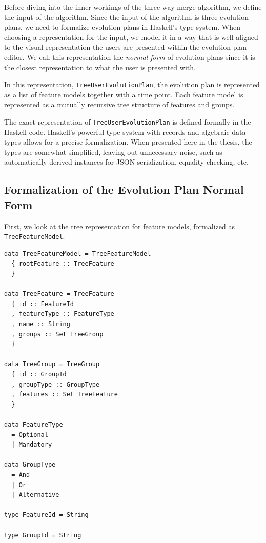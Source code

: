 \documentclass[a4paper,english]{ifimaster}
\begin{document}
Before diving into the inner workings of the three-way merge algorithm, we define the input of the algorithm. Since the input of the algorithm is three evolution plans, we need to formalize evolution plans in Haskell's type system. When choosing a representation for the input, we model it in a way that is well-aligned to the visual representation the users are presented within the evolution plan editor. We call this representation the \textit{normal form} of evolution plans since it is the closest representation to what the user is presented with.

In this representation, \texttt{Tree\-User\-Evolution\-Plan}, the evolution plan is represented as a list of feature models together with a time point. Each feature model is represented as a mutually recursive tree structure of features and groups. 

The exact representation of \texttt{Tree\-User\-Evolution\-Plan} is defined formally in the Haskell code. Haskell's powerful type system with records and algebraic data types allows for a precise formalization. When presented here in the thesis, the types are somewhat simplified, leaving out unnecessary noise, such as automatically derived instances for JSON serialization, equality checking, etc.

\subsection{Formalization of the Evolution Plan Normal Form}%
\label{sub:formalization_of_the_evolution_plan_normal_form}

First, we look at the tree representation for feature models, formalized as \texttt{Tree\-Feature\-Model}.

\begin{verbatim}
data TreeFeatureModel = TreeFeatureModel
  { rootFeature :: TreeFeature
  }

data TreeFeature = TreeFeature
  { id :: FeatureId
  , featureType :: FeatureType
  , name :: String
  , groups :: Set TreeGroup
  }

data TreeGroup = TreeGroup
  { id :: GroupId
  , groupType :: GroupType
  , features :: Set TreeFeature
  }

data FeatureType
  = Optional
  | Mandatory

data GroupType
  = And
  | Or
  | Alternative

type FeatureId = String

type GroupId = String
\end{verbatim}
\end{document}

